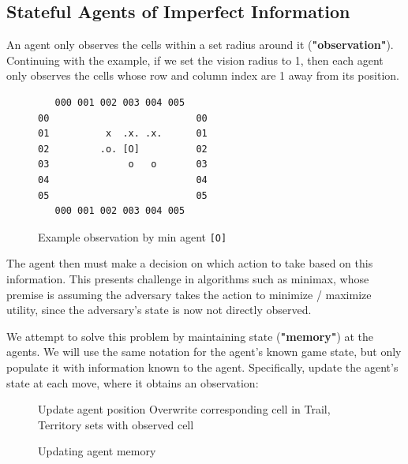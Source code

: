 \documentclass{article}
\begin{document}
\subsection{Stateful Agents of Imperfect Information}



An agent only observes the cells within a set radius around it (\textbf{"observation"}). Continuing with the example, if we set the vision radius to 1, then each agent only observes the cells whose row and column index are 1 away from its position.

\begin{figure}[h!]
\centering
\begin{BVerbatim}
   000 001 002 003 004 005     
00                          00
01          x  .x. .x.      01
02         .o. [O]          02
03              o   o       03
04                          04
05                          05
   000 001 002 003 004 005 
\end{BVerbatim}
\caption{Example observation by min agent \texttt{[O]}}
\end{figure}

The agent then must make a decision on which action to take based on this information. This presents challenge in algorithms such as minimax, whose premise is assuming the adversary takes the action to minimize / maximize utility, since the adversary's state is now not directly observed. 

We attempt to solve this problem by maintaining state (\textbf{"memory"}) at the agents. We will use the same notation for the agent's known game state, but only populate it with information known to the agent. Specifically, update the agent's state at each move, where it obtains an observation:

\begin{figure}[H]
  \centering
  \begin{minipage}{.7\linewidth}
    \begin{algorithm}[H]
      \SetAlgoLined
      \newcommand{\forcond}{$i=0$ \KwTo $n$}
      Update agent position\;
       {
        Overwrite corresponding cell in Trail, Territory sets with observed cell\;
      }
      \caption{Updating agent memory}
    \end{algorithm}
  \end{minipage}
\end{figure}
\end{document}
